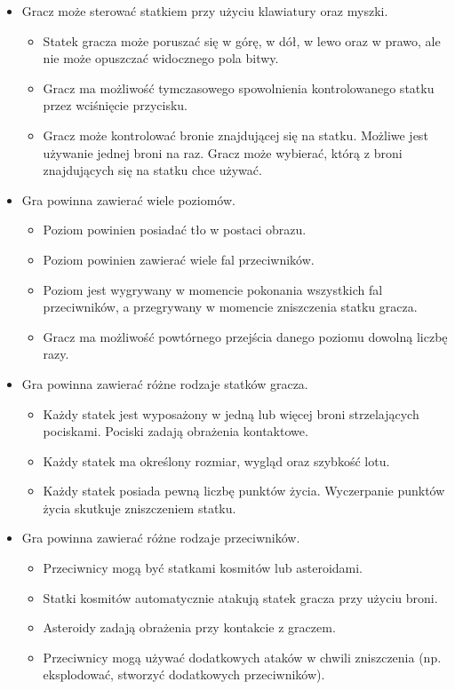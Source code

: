 \documentclass{article}
\begin{document}
			\begin{itemize}
				\item Gracz może sterować statkiem przy użyciu klawiatury oraz myszki.
				\begin{itemize}
					\item Statek gracza może poruszać się w górę, w dół, w lewo oraz w prawo, ale nie może opuszczać widocznego pola bitwy.
					\item Gracz ma możliwość tymczasowego spowolnienia kontrolowanego statku przez wciśnięcie przycisku.
					\item Gracz może kontrolować bronie znajdującej się na statku. Możliwe jest używanie jednej broni na raz. Gracz może wybierać, którą z broni znajdujących się na statku chce używać.
				\end{itemize}
				
				\item Gra powinna zawierać wiele poziomów.
				\begin{itemize}
					\item Poziom powinien posiadać tło w postaci obrazu.
					\item Poziom powinien zawierać wiele fal przeciwników.
					\item Poziom jest wygrywany w momencie pokonania wszystkich fal przeciwników, a przegrywany w momencie zniszczenia statku gracza.
					\item Gracz ma możliwość powtórnego przejścia danego poziomu dowolną liczbę razy.
				\end{itemize}
				
				\item Gra powinna zawierać różne rodzaje statków gracza.
				\begin{itemize}
					\item Każdy statek jest wyposażony w jedną lub więcej broni strzelających pociskami. Pociski zadają obrażenia kontaktowe.
					\item Każdy statek ma określony rozmiar, wygląd oraz szybkość lotu.
					\item Każdy statek posiada pewną liczbę punktów życia. Wyczerpanie punktów życia skutkuje zniszczeniem statku.
				\end{itemize}
			
				\item Gra powinna zawierać różne rodzaje przeciwników.
				\begin{itemize}
					\item Przeciwnicy mogą być statkami kosmitów lub asteroidami.
					\item Statki kosmitów automatycznie atakują statek gracza przy użyciu broni.
					\item Asteroidy zadają obrażenia przy kontakcie z graczem.
					\item Przeciwnicy mogą używać dodatkowych ataków w chwili zniszczenia (np. eksplodować, stworzyć dodatkowych przeciwników).
					

\end{itemize}
\end{itemize}
\end{document}
